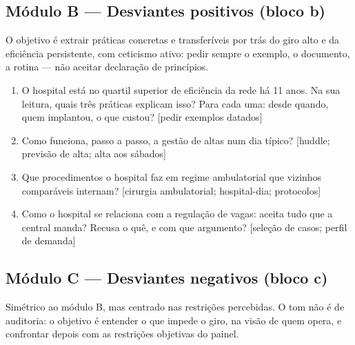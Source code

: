 \documentclass[12pt,a4paper]{article}
\newcommand{\achado}[1]{%
  \noindent{\small\itshape\textcolor{black!60}{Achado que a pergunta
  testa: #1}}\par\smallskip}
\begin{document}
\subsection{Módulo B --- Desviantes positivos (bloco b)}

O objetivo é extrair práticas concretas e transferíveis por trás do giro
alto e da eficiência persistente, com ceticismo ativo: pedir sempre o
exemplo, o documento, a rotina --- não aceitar declaração de princípios.

\begin{enumerate}[itemsep=2pt]
  \item O hospital está no quartil superior de eficiência da rede há 11 anos. Na sua leitura, quais três práticas explicam isso? Para cada uma: desde quando, quem implantou, o que custou? [pedir exemplos datados]
  \par\nopagebreak\achado{a persistência no quartil superior em DEA e SFA simultaneamente afasta artefato de método; deve haver prática real por trás.}
  \item Como funciona, passo a passo, a gestão de altas num dia típico? [huddle; previsão de alta; alta aos sábados]
  \par\nopagebreak\achado{giro alto com TMP baixo é a assinatura operacional dos desviantes positivos.}
  \item Que procedimentos o hospital faz em regime ambulatorial que vizinhos comparáveis internam? [cirurgia ambulatorial; hospital-dia; protocolos]
  \par\nopagebreak\achado{a produção alta com leitos comparáveis sugere substituição ambulatorial; a pergunta lista os procedimentos.}
  \item Como o hospital se relaciona com a regulação de vagas: aceita tudo que a central manda? Recusa o quê, e com que argumento? [seleção de casos; perfil de demanda]
  \par\nopagebreak\achado{eficiência alta pode ser gestão ou seleção de pacientes mais leves; a pergunta confronta a hipótese de seleção --- ler junto com a complexidade estrutural do hospital.}
\end{enumerate}

\subsection{Módulo C --- Desviantes negativos (bloco c)}

Simétrico ao módulo B, mas centrado nas restrições percebidas. O tom não
é de auditoria: o objetivo é entender o que impede o giro, na visão de
quem opera, e confrontar depois com as restrições objetivas do painel.
\end{document}
